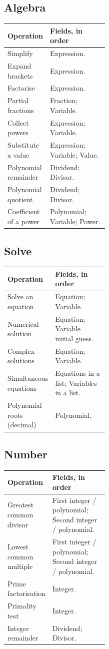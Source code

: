 \subsection{Algebra}
{\small
\begin{tabularx}{\linewidth}{@{}p{0.40\linewidth}X@{}}\toprule
Operation & Fields, in order\\\midrule
Simplify & Expression.\\[3pt]
Expand brackets & Expression.\\[3pt]
Factorise & Expression.\\[3pt]
Partial fractions & Fraction; Variable.\\[3pt]
Collect powers & Expression; Variable.\\[3pt]
Substitute a value & Expression; Variable; Value.\\[3pt]
Polynomial remainder & Dividend; Divisor.\\[3pt]
Polynomial quotient & Dividend; Divisor.\\[3pt]
Coefficient of a power & Polynomial; Variable; Power.\\[3pt]
\bottomrule\end{tabularx}}
\subsection{Solve}
{\small
\begin{tabularx}{\linewidth}{@{}p{0.40\linewidth}X@{}}\toprule
Operation & Fields, in order\\\midrule
Solve an equation & Equation; Variable.\\[3pt]
Numerical solution & Equation; Variable = initial guess.\\[3pt]
Complex solutions & Equation; Variable.\\[3pt]
Simultaneous equations & Equations in a list; Variables in a list.\\[3pt]
Polynomial roots (decimal) & Polynomial.\\[3pt]
\bottomrule\end{tabularx}}
\subsection{Number}
{\small
\begin{tabularx}{\linewidth}{@{}p{0.40\linewidth}X@{}}\toprule
Operation & Fields, in order\\\midrule
Greatest common divisor & First integer / polynomial; Second integer / polynomial.\\[3pt]
Lowest common multiple & First integer / polynomial; Second integer / polynomial.\\[3pt]
Prime factorisation & Integer.\\[3pt]
Primality test & Integer.\\[3pt]
Integer remainder & Dividend; Divisor.\\[3pt]
\bottomrule\end{tabularx}}
\clearpage

